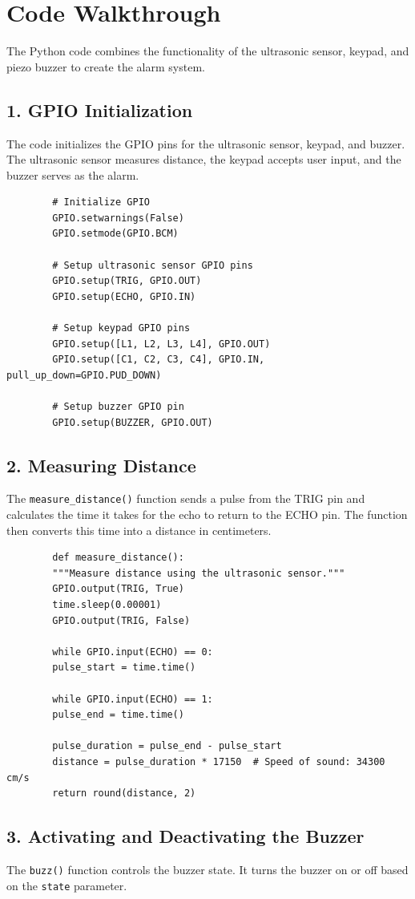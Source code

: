\documentclass{article}
\begin{document}
	\newpage
	\section*{Code Walkthrough}
	The Python code combines the functionality of the ultrasonic sensor, keypad, and piezo buzzer to create the alarm system.
	
	\subsection*{1. GPIO Initialization}
	The code initializes the GPIO pins for the ultrasonic sensor, keypad, and buzzer. The ultrasonic sensor measures distance, the keypad accepts user input, and the buzzer serves as the alarm.
	
	\begin{lstlisting}
		# Initialize GPIO
		GPIO.setwarnings(False)
		GPIO.setmode(GPIO.BCM)
		
		# Setup ultrasonic sensor GPIO pins
		GPIO.setup(TRIG, GPIO.OUT)
		GPIO.setup(ECHO, GPIO.IN)
		
		# Setup keypad GPIO pins
		GPIO.setup([L1, L2, L3, L4], GPIO.OUT)
		GPIO.setup([C1, C2, C3, C4], GPIO.IN, pull_up_down=GPIO.PUD_DOWN)
		
		# Setup buzzer GPIO pin
		GPIO.setup(BUZZER, GPIO.OUT)
	\end{lstlisting}
	
	\subsection*{2. Measuring Distance}
	The \texttt{measure\_distance()} function sends a pulse from the TRIG pin and calculates the time it takes for the echo to return to the ECHO pin. The function then converts this time into a distance in centimeters.
	
	\begin{lstlisting}
		def measure_distance():
		"""Measure distance using the ultrasonic sensor."""
		GPIO.output(TRIG, True)
		time.sleep(0.00001)
		GPIO.output(TRIG, False)
		
		while GPIO.input(ECHO) == 0:
		pulse_start = time.time()
		
		while GPIO.input(ECHO) == 1:
		pulse_end = time.time()
		
		pulse_duration = pulse_end - pulse_start
		distance = pulse_duration * 17150  # Speed of sound: 34300 cm/s
		return round(distance, 2)
	\end{lstlisting}
	
	\subsection*{3. Activating and Deactivating the Buzzer}
	The \texttt{buzz()} function controls the buzzer state. It turns the buzzer on or off based on the \texttt{state} parameter.
	
\end{document}
